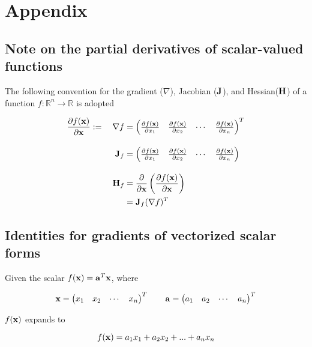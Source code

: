 \documentclass{article}
\newcommand{\R}{\mathbb{R}}
\newcommand{\vect}[1]{\textbf{\textrm{#1}}}
\newcommand{\pd}[2]{\frac{\partial {#1}}{\partial {#2}}}
\begin{document}
\section{Appendix} \label{appendix}

\subsection{Note on the partial derivatives of scalar-valued functions}
The following convention for the gradient ($\nabla$), Jacobian ($\vect{J}$), and Hessian($\vect{H}$) of a function $f: \R^n \rightarrow \R$ is adopted

\begin{align}
	\pd{f(\vect{x})}{\vect{x}} := \quad \nabla f & = 
	\begin{pmatrix}
		\pd{f(\vect{x})}{x_1} & \pd{f(\vect{x})}{x_2} & \cdots & \pd{f(\vect{x})}{x_n}
	\end{pmatrix}^{T} \label{gradient} \\[1em]
	\vect{J}_f & = 
	\begin{pmatrix}
		\pd{f(\vect{x})}{x_1} & \pd{f(\vect{x})}{x_2} & \cdots & \pd{f(\vect{x})}{x_n}
	\end{pmatrix} \label{jacobian} \\[1em]
	\vect{H}_f & = \pd{}{\vect{x}} \left( \pd{f(\vect{x})}{\vect{x}} \right) \nonumber \\
	& = \vect{J}_f(\nabla f)^{T} \label{hessian}
\end{align}	

\subsection{Identities for gradients of vectorized scalar forms}
Given the scalar $f(\vect{x}) = \vect{a}^{T}\vect{x}$, where

\begin{equation*}
	\vect{x}= 
	\begin{pmatrix}
		x_1 & x_2 & \cdots & x_n
	\end{pmatrix}^{T}
	\qquad \vect{a} = 
	\begin{pmatrix}
		a_1 & a_2 & \cdots & a_n
	\end{pmatrix}^{T}
\end{equation*}

$f(\vect{x})$ expands to

\begin{equation*}
	f(\vect{x}) = a_1x_1 + a_2x_2 + ... + a_nx_n
\end{equation*}
\end{document}
